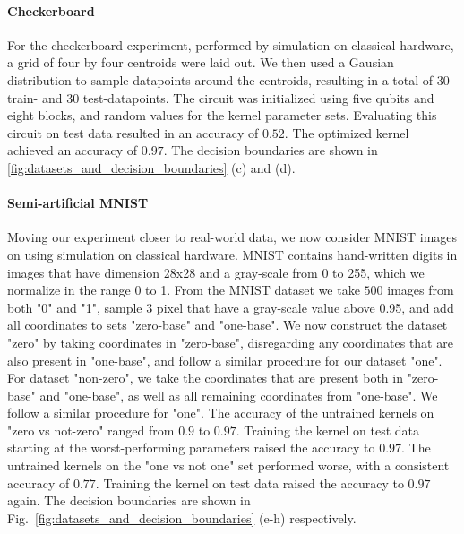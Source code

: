 \documentclass[twocolumn,superscriptaddress,nofootinbib]{revtex4-2}
\begin{document}
\paragraph{Checkerboard}
    For the checkerboard experiment, performed by simulation on classical hardware, a grid of four by four centroids were laid out. 
    We then used a Gausian distribution to sample datapoints around the centroids, resulting in a total of 30 train- and 30 test-datapoints. 
    The circuit was initialized using five qubits and eight blocks, and random values for the kernel parameter sets. 
    Evaluating this circuit on test data resulted in an accuracy of $0.52$. The optimized kernel achieved an accuracy of $0.97$. The decision boundaries are shown in \ref{fig:datasets_and_decision_boundaries} (c) and (d).
%
\paragraph{Semi-artificial MNIST}
    Moving our experiment closer to real-world data, we now consider MNIST images on using simulation on classical hardware. 
    MNIST contains hand-written digits in images that have dimension 28x28 and a gray-scale from 0 to 255, which we normalize in the range 0 to 1.
    From the MNIST dataset we take $500$ images from both "0" and "1", sample 3 pixel that have a gray-scale value above 0.95, and add all coordinates to sets "zero-base" and "one-base". 
    We now construct the dataset "zero" by taking coordinates in "zero-base", disregarding any coordinates that are also present in "one-base", and follow a similar procedure for our dataset "one". 
    For dataset "non-zero", we take the coordinates that are present both in "zero-base" and "one-base", as well as all remaining coordinates from "one-base".
    We follow a similar procedure for "one". 
    The accuracy of the untrained kernels on "zero vs not-zero" ranged from $0.9$ to $0.97$. 
    Training the kernel on test data starting at the worst-performing parameters raised the accuracy to $0.97$. 
    The untrained kernels on the "one vs not one" set performed worse, with a consistent accuracy of $0.77$. 
    Training the kernel on test data raised the accuracy to $0.97$ again. 
    The decision boundaries are shown in Fig.~\ref{fig:datasets_and_decision_boundaries} (e-h) respectively. 
\end{document}
